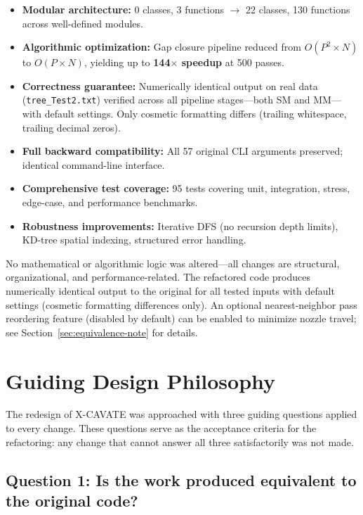 \documentclass[11pt,a4paper]{article}
\newcommand{\bigO}[1]{$O(#1)$}
\begin{document}
\begin{itemize}[leftmargin=2em]
    \item \textbf{Modular architecture:} 0 classes, 3 functions $\rightarrow$ 22 classes, 130 functions across well-defined modules.
    \item \textbf{Algorithmic optimization:} Gap closure pipeline reduced from \bigO{P^2 \times N} to \bigO{P \times N}, yielding up to \textbf{144$\times$ speedup} at 500 passes.
    \item \textbf{Correctness guarantee:} Numerically identical output on real data (\texttt{tree\_Test2.txt}) verified across all pipeline stages---both SM and MM---with default settings. Only cosmetic formatting differs (trailing whitespace, trailing decimal zeros).
    \item \textbf{Full backward compatibility:} All 57 original CLI arguments preserved; identical command-line interface.
    \item \textbf{Comprehensive test coverage:} 95 tests covering unit, integration, stress, edge-case, and performance benchmarks.
    \item \textbf{Robustness improvements:} Iterative DFS (no recursion depth limits), KD-tree spatial indexing, structured error handling.
\end{itemize}

No mathematical or algorithmic logic was altered---all changes are structural, organizational, and performance-related. The refactored code produces numerically identical output to the original for all tested inputs with default settings (cosmetic formatting differences only). An optional nearest-neighbor pass reordering feature (disabled by default) can be enabled to minimize nozzle travel; see Section~\ref{sec:equivalence-note} for details.

\section{Guiding Design Philosophy}

The redesign of X-CAVATE was approached with three guiding questions applied to every change. These questions serve as the acceptance criteria for the refactoring: any change that cannot answer all three satisfactorily was not made.

\subsection{Question 1: Is the work produced equivalent to the original code?}
\end{document}
